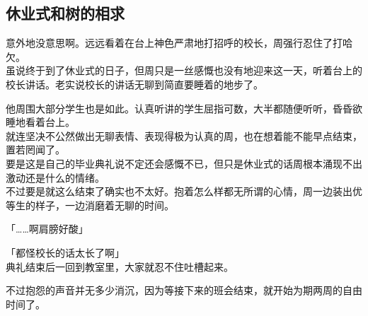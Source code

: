 \subsection{休业式和树的相求}

意外地没意思啊。远远看着在台上神色严肃地打招呼的校长，周强行忍住了打哈欠。\\

虽说终于到了休业式的日子，但周只是一丝感慨也没有地迎来这一天，听着台上的校长讲话。老实说校长的讲话无聊到简直要睡着的地步了。

他周围大部分学生也是如此。认真听讲的学生屈指可数，大半都随便听听，昏昏欲睡地看着台上。\\

就连坚决不公然做出无聊表情、表现得极为认真的周，也在想着能不能早点结束，置若罔闻了。\\

要是这是自己的毕业典礼说不定还会感慨不已，但只是休业式的话周根本涌现不出激动还是什么的情绪。\\

不过要是就这么结束了确实也不太好。抱着怎么样都无所谓的心情，周一边装出优等生的样子，一边消磨着无聊的时间。\\

\vspace{2\baselineskip}

「……啊肩膀好酸」

「都怪校长的话太长了啊」\\

典礼结束后一回到教室里，大家就忍不住吐槽起来。

不过抱怨的声音并无多少消沉，因为等接下来的班会结束，就开始为期两周的自由时间了。\\

